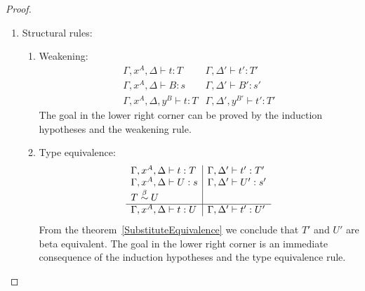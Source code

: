 \begin{theorem}
\begin{proof}
\begin{enumerate}
            \item Structural rules:
            \begin{enumerate}
                \item Weakening:
                $$
                \begin{array}{l|l}
                    \Gamma,x^A,\Delta \vdash t: T
                    &
                    \Gamma,\Delta' \vdash t' : T'
                    \\
                    \Gamma,x^A,\Delta \vdash B: s
                    &
                    \Gamma,\Delta' \vdash B' : s'
                    \\
                    \hline
                    \Gamma,x^A,\Delta,y^B \vdash t : T
                    &
                    \Gamma,\Delta',y^{B'} \vdash t' : T'
                \end{array}
                $$
                The goal in the lower right corner can be proved by the
                    induction hypotheses and the weakening rule.

                \item Type equivalence:
                $$
                \begin{array}{l|l}
                    \Gamma,x^A,\Delta \vdash t : T
                    &
                    \Gamma,\Delta' \vdash t' : T'
                    \\
                    \Gamma,x^A,\Delta \vdash U : s
                    &
                    \Gamma,\Delta' \vdash U' : s'
                    \\
                    T \stackrel{\beta}{\sim} U
                    \\
                    \hline
                    \Gamma,x^A,\Delta \vdash t : U
                    &
                    \Gamma,\Delta' \vdash t' : U'
                \end{array}
                $$
                From the theorem~\ref{SubstituteEquivalence} we conclude that
                    $T'$ and $U'$ are beta equivalent.
                The goal in the lower right corner is an immediate consequence
                of the induction hypotheses and the type equivalence rule.
            \end{enumerate}

        \end{enumerate}
    \end{proof}
\end{theorem}




